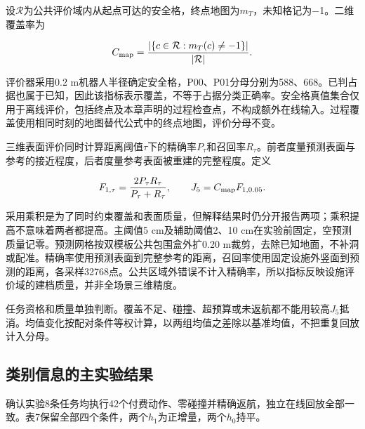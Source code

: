 \documentclass[11pt,a4paper]{article}
\numberwithin{equation}{section}
\begin{document}
设\(\mathcal R\)为公共评价域内从起点可达的安全格，终点地图为\(m_T\)，未知格记为−1。二维覆盖率为

\begin{equation}
C_{\rm map}=\frac{|\{c\in\mathcal R:m_T(c)\ne-1\}|}{|\mathcal R|}.
\end{equation}

评价器采用0.2 m机器人半径确定安全格，P00、P01分母分别为588、668。已判占据也属于已知，因此该指标表示覆盖，不等于占据分类正确率。安全格真值集合仅用于离线评价，包括终点及本章声明的过程检查点，不构成额外在线输入。过程覆盖使用相同时刻的地图替代公式中的终点地图，评价分母不变。

三维表面评价同时计算距离阈值\(\tau\)下的精确率\(P_\tau\)和召回率\(R_\tau\)。前者度量预测表面与参考的接近程度，后者度量参考表面被重建的完整程度。定义

\begin{equation}
F_{1,\tau}=\frac{2P_\tau R_\tau}{P_\tau+R_\tau},
\qquad J_5=C_{\rm map}F_{1,0.05}.
\end{equation}

采用乘积是为了同时约束覆盖和表面质量，但解释结果时仍分开报告两项；乘积提高不意味着两者都提高。主阈值5 cm及辅助阈值2、10 cm在实验前固定，空预测质量记零。预测网格按双模板公共包围盒外扩0.20 m裁剪，去除已知地面，不补洞或配准。精确率使用预测表面到完整参考的距离，召回率使用固定设施外竖面到预测的距离，各采样32768点。公共区域外错误不计入精确率，所以指标反映设施评价域的建档质量，并非全场景三维精度。

任务资格和质量单独判断。覆盖不足、碰撞、超预算或未返航都不能用较高\(J_5\)抵消。均值变化按配对条件等权计算，以两组均值之差除以基准均值，不把重复回放计入分母。

\hypertarget{ux7c7bux522bux4fe1ux606fux7684ux4e3bux5b9eux9a8cux7ed3ux679c}{%
\subsection{类别信息的主实验结果}\label{ux7c7bux522bux4fe1ux606fux7684ux4e3bux5b9eux9a8cux7ed3ux679c}}

确认实验8条任务均执行42个付费动作、零碰撞并精确返航，独立在线回放全部一致。表7保留全部四个条件，两个\(h_1\)为正增量，两个\(h_0\)持平。
\end{document}
